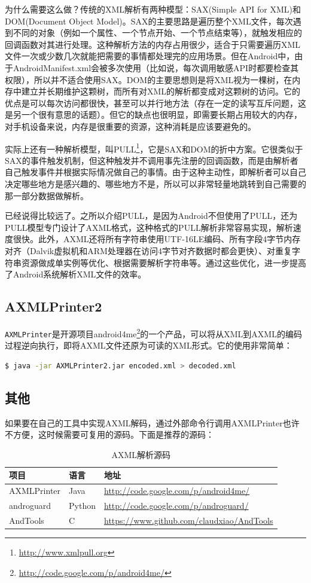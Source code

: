 为什么需要这么做？传统的XML解析有两种模型：SAX(Simple API for XML)和DOM(Document Object Model)。SAX的主要思路是遍历整个XML文件，每次遇到不同的对象（例如一个属性、一个节点开始、一个节点结束等），就触发相应的回调函数对其进行处理。这种解析方法的内存占用很少，适合于只需要遍历XML文件一次或少数几次就能把需要的事情都处理完的应用场景。但在Android中，由于AndroidManifest.xml会被多次使用（比如说，每次调用敏感API时都要检查其权限），所以并不适合使用SAX。DOM的主要思想则是将XML视为一棵树，在内存中建立并长期维护这颗树，而所有对XML的解析都变成对这颗树的访问。它的优点是可以每次访问都很快，甚至可以并行地方法（存在一定的读写互斥问题，这是另一个很有意思的话题）。但它的缺点也很明显，即需要长期占用较大的内存，对手机设备来说，内存是很重要的资源，这种消耗是应该要避免的。

实际上还有一种解析模型，叫PULL\footnote{\url{http://www.xmlpull.org}}，它是SAX和DOM的折中方案。它很类似于SAX的事件触发机制，但这种触发并不调用事先注册的回调函数，而是由解析者自己触发事件并根据实际情况做自己的事情。由于这种主动性，即解析者可以自己决定哪些地方是感兴趣的、哪些地方不是，所以可以非常轻量地跳转到自己需要的那一部分数据做解析。

已经说得比较远了。之所以介绍PULL，是因为Android不但使用了PULL，还为PULL模型专门设计了AXML格式，这种格式的PULL解析非常容易实现，解析速度很快。此外，AXML还将所有字符串使用UTF-16LE编码、所有字段4字节内存对齐（Dalvik虚拟机和ARM处理器在访问4字节对齐数据时都会更快）、对重复字符串资源做成单实例等优化、根据需要解析字符串等。通过这些优化，进一步提高了Android系统解析XML文件的效率。

\subsection{AXMLPrinter2}
\lstinline!AXMLPrinter!是开源项目android4me\footnote{\url{http://code.google.com/p/android4me/}}的一个产品，可以将从XML到AXML的编码过程逆向执行，即将AXML文件还原为可读的XML形式。它的使用非常简单：
\begin{lstlisting}[language=bash, numbers=none]
 $ java -jar AXMLPrinter2.jar encoded.xml > decoded.xml
\end{lstlisting}

\subsection{其他}
如果要在自己的工具中实现AXML解码，通过外部命令行调用AXMLPrinter也许不方便，这时候需要可复用的源码。下面是推荐的源码：

\begin{table}[htbp]
  \caption{AXML解析源码}
  \centering
  \begin{tabular}{lll}
    \toprule
    项目 & 语言 & 地址 \\
    \midrule
    AXMLPrinter & Java & \url{http://code.google.com/p/android4me/} \\
    androguard & Python &  \url{http://code.google.com/p/androguard/}\\
    AndTools & C & \url{https://www.github.com/claudxiao/AndTools} \\
    \bottomrule
  \end{tabular}
\end{table}

